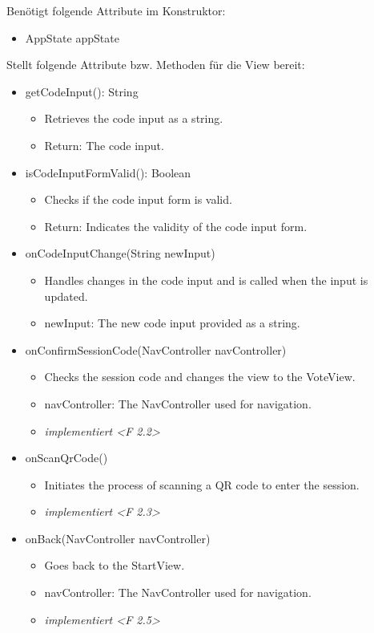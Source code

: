 \documentclass[oneside, ngerman]{sdqtechreport}
\begin{document}
Benötigt folgende Attribute im Konstruktor:
\begin{itemize}
    \item AppState appState
\end{itemize}
Stellt folgende Attribute bzw. Methoden für die View bereit:
\begin{itemize}

    \item getCodeInput(): String
        \begin{itemize}
            \item Retrieves the code input as a string.
            \item Return: The code input.
        \end{itemize}
    \item isCodeInputFormValid(): Boolean
        \begin{itemize}
            \item Checks if the code input form is valid.
            \item Return: Indicates the validity of the code input form.
        \end{itemize}
    \item onCodeInputChange(String newInput)
        \begin{itemize}
            \item Handles changes in the code input and is called when the input is updated.
            \item newInput: The new code input provided as a string.
        \end{itemize}
    \item onConfirmSessionCode(NavController navController)
        \begin{itemize}
            \item Checks the session code and changes the view to the VoteView.
            \item navController: The NavController used for navigation.
            \item \textit{implementiert <F 2.2>}
        \end{itemize}
    \item onScanQrCode()
        \begin{itemize}
            \item Initiates the process of scanning a QR code to enter the session.
            \item \textit{implementiert <F 2.3>}
        \end{itemize}
    \item onBack(NavController navController)
        \begin{itemize}
            \item Goes back to the StartView.
            \item navController: The NavController used for navigation.
            \item \textit{implementiert <F 2.5>}
        \end{itemize}
\end{itemize}
\end{document}
